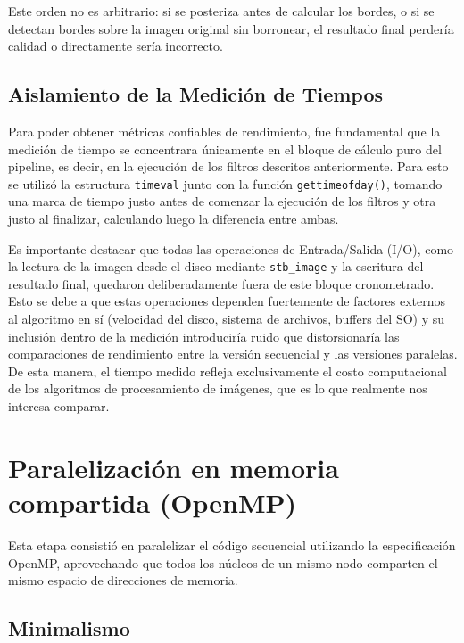 Este orden no es arbitrario: si se posteriza antes de calcular los bordes, o si se detectan bordes sobre la imagen original sin borronear, el resultado final perdería calidad o directamente sería incorrecto.


\subsection{Aislamiento de la Medición de Tiempos}

Para poder obtener métricas confiables de rendimiento, fue fundamental que la medición de tiempo se concentrara únicamente en el bloque de cálculo puro del pipeline, es decir, en la ejecución de los filtros descritos anteriormente. Para esto se utilizó la estructura \texttt{timeval} junto con la función \texttt{gettimeofday()}, tomando una marca de tiempo justo antes de comenzar la ejecución de los filtros y otra justo al finalizar, calculando luego la diferencia entre ambas.

Es importante destacar que todas las operaciones de Entrada/Salida (I/O), como la lectura de la imagen desde el disco mediante \texttt{stb\_image} y la escritura del resultado final, quedaron deliberadamente fuera de este bloque cronometrado. Esto se debe a que estas operaciones dependen fuertemente de factores externos al algoritmo en sí (velocidad del disco, sistema de archivos, buffers del SO) y su inclusión dentro de la medición introduciría ruido que distorsionaría las comparaciones de rendimiento entre la versión secuencial y las versiones paralelas. De esta manera, el tiempo medido refleja exclusivamente el costo computacional de los algoritmos de procesamiento de imágenes, que es lo que realmente nos interesa comparar.



\section{Paralelización en memoria compartida (OpenMP)}

Esta etapa consistió en paralelizar el código secuencial utilizando la especificación OpenMP, aprovechando que todos los núcleos de un mismo nodo comparten el mismo espacio de direcciones de memoria.


\subsection{Minimalismo}


